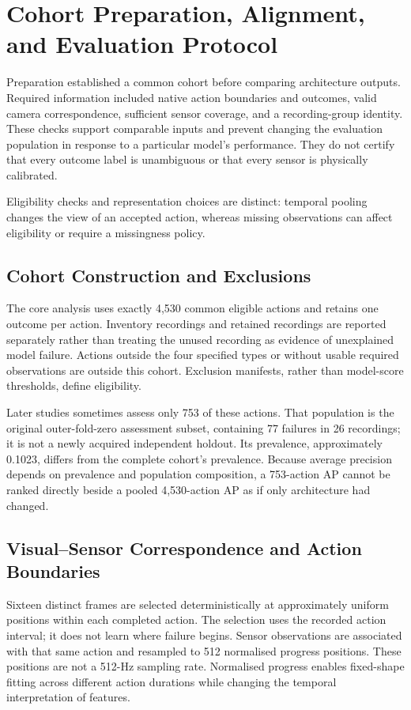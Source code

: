 \section{Cohort Preparation, Alignment, and Evaluation Protocol}
Preparation established a common cohort before comparing architecture outputs. Required
information included native action boundaries and outcomes, valid camera correspondence,
sufficient sensor coverage, and a recording-group identity. These checks support
comparable inputs and prevent changing the evaluation population in response to a
particular model's performance. They do not certify that every outcome label is
unambiguous or that every sensor is physically calibrated.

Eligibility checks and representation choices are distinct: temporal pooling changes the
view of an accepted action, whereas missing observations can affect eligibility or
require a missingness policy.

\subsection{Cohort Construction and Exclusions}
The core analysis uses exactly 4,530 common eligible actions and retains one outcome per
action. Inventory recordings and retained recordings are reported separately rather than
treating the unused recording as evidence of unexplained model failure. Actions outside
the four specified types or without usable required observations are outside this
cohort. Exclusion manifests, rather than model-score thresholds, define eligibility.

Later studies sometimes assess only 753 of these actions. That population is the
original outer-fold-zero assessment subset, containing 77 failures in 26 recordings; it
is not a newly acquired independent holdout. Its prevalence, approximately 0.1023,
differs from the complete cohort's prevalence. Because average precision depends on
prevalence and population composition, a 753-action AP cannot be ranked directly beside
a pooled 4,530-action AP as if only architecture had changed.

\subsection{Visual--Sensor Correspondence and Action Boundaries}
Sixteen distinct frames are selected deterministically at approximately uniform
positions within each completed action. The selection uses the recorded action interval;
it does not learn where failure begins. Sensor observations are associated with that
same action and resampled to 512 normalised progress positions. These positions are not
a 512-Hz sampling rate. Normalised progress enables fixed-shape fitting across different
action durations while changing the temporal interpretation of features.

